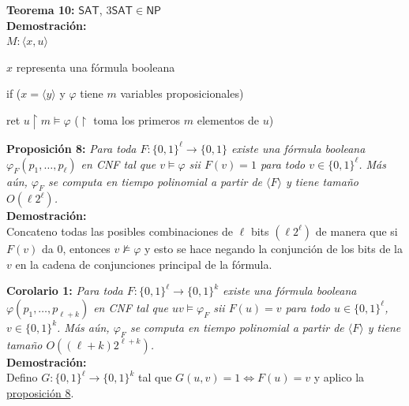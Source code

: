 \documentclass{article}
\begin{document}
\begin{flushleft}
  \textbf{\hypertarget{teo10}{Teorema 10:}}
  $\mathsf{SAT}$, $3\mathsf{SAT} \in \mathsf{NP}$ \\[0.5em]

  \textbf{\textcolor{Mulberry}{Demostración:}} \\[0.5em]

  $M: \langle x,u \rangle$
  
  \quad $x$ representa una fórmula booleana

  \quad if ($x = \langle y \rangle$ y $\varphi$ tiene $m$ variables proposicionales)

  \qquad ret $u \upharpoonright m \models \varphi$ \qquad \textcolor{OliveGreen}{($\upharpoonright$ toma
  los primeros $m$ elementos de $u$)}
\end{flushleft}

\begin{flushleft}
  \textbf{\hypertarget{prop8}{Proposición 8:}}
  \textit{Para toda $F : \{ 0,1 \}^\ell \rightarrow \{ 0,1 \}$ existe una fórmula booleana $\varphi_F(p_1,
  \dots, p_\ell)$ en CNF tal que $v \models \varphi$ sii $F(v) = 1$ para todo $v \in \{ 0,1 \}^\ell$. Más
  aún, $\varphi_F$ se computa en tiempo polinomial a partir de $\langle F \rangle$ y tiene tamaño $O(\ell
  2^\ell)$.} \\[0.5em]

  \textbf{\textcolor{Mulberry}{Demostración:}} \\[0.5em]

  Concateno todas las posibles combinaciones de $\ell$ bits $(\ell2^\ell)$ de manera que si $F(v)$ da $0$,
  entonces $v \not\models \varphi$ y esto se hace negando la conjunción de los bits de la $v$ en la cadena de 
  conjunciones principal de la fórmula.
\end{flushleft}

\begin{flushleft}
  \textbf{\hypertarget{cor1}{Corolario 1:}}
  \textit{Para toda $F : \{ 0,1 \}^\ell \rightarrow \{ 0,1 \}^k$ existe una fórmula booleana $\varphi(
  p_1, \dots, p_{\ell + k})$ en CNF tal que $uv \models \varphi_F$ sii $F(u) = v$ para todo $u \in \{
  0,1 \}^\ell$, $v \in \{0,1 \}^k$. Más aún, $\varphi_F$ se computa en tiempo polinomial a partir de 
  $\langle F \rangle$ y tiene tamaño $O((\ell + k)2^{\ell + k})$.} \\[0.5em]

  \textbf{\textcolor{Mulberry}{Demostración:}} \\[0.5em]

  Defino $G : \{ 0,1 \}^\ell \rightarrow \{ 0,1 \}^k$ tal que $G(u,v) = 1 \iff F(u) = v$ y aplico la 
  \hyperlink{prop8}{\textcolor{Rhodamine}{proposición 8}}.
\end{flushleft}
\end{document}
